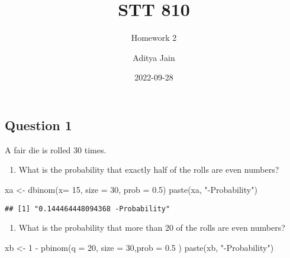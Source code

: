 \documentclass[
]{article}
\title{STT 810}
\subtitle{Homework 2}
\author{Aditya Jain}
\date{2022-09-28}
\newenvironment{Shaded}{\begin{snugshade}}{\end{snugshade}}
\newcommand{\AttributeTok}[1]{\textcolor[rgb]{0.77,0.63,0.00}{#1}}
\newcommand{\DecValTok}[1]{\textcolor[rgb]{0.00,0.00,0.81}{#1}}
\newcommand{\FloatTok}[1]{\textcolor[rgb]{0.00,0.00,0.81}{#1}}
\newcommand{\FunctionTok}[1]{\textcolor[rgb]{0.00,0.00,0.00}{#1}}
\newcommand{\NormalTok}[1]{#1}
\newcommand{\OtherTok}[1]{\textcolor[rgb]{0.56,0.35,0.01}{#1}}
\newcommand{\SpecialCharTok}[1]{\textcolor[rgb]{0.00,0.00,0.00}{#1}}
\newcommand{\StringTok}[1]{\textcolor[rgb]{0.31,0.60,0.02}{#1}}
\providecommand{\tightlist}{%
  \setlength{\itemsep}{0pt}\setlength{\parskip}{0pt}}
\begin{document}
\maketitle

{
\setcounter{tocdepth}{2}
\tableofcontents
}
\newpage

\hypertarget{question-1}{%
\subsection{Question 1}\label{question-1}}

A fair die is rolled 30 times.

\begin{enumerate}
\def\labelenumi{\alph{enumi}.}
\tightlist
\item
  What is the probability that exactly half of the rolls are even
  numbers?
\end{enumerate}

\begin{Shaded}
\begin{Highlighting}[]
\NormalTok{xa }\OtherTok{\textless{}{-}} \FunctionTok{dbinom}\NormalTok{(}\AttributeTok{x=} \DecValTok{15}\NormalTok{, }\AttributeTok{size =} \DecValTok{30}\NormalTok{, }\AttributeTok{prob =} \FloatTok{0.5}\NormalTok{)}
\FunctionTok{paste}\NormalTok{(xa, }\StringTok{"{-}Probability"}\NormalTok{)}
\end{Highlighting}
\end{Shaded}

\begin{verbatim}
## [1] "0.144464448094368 -Probability"
\end{verbatim}

\begin{enumerate}
\def\labelenumi{\alph{enumi}.}
\setcounter{enumi}{1}
\tightlist
\item
  What is the probability that more than 20 of the rolls are even
  numbers?
\end{enumerate}

\begin{Shaded}
\begin{Highlighting}[]
\NormalTok{xb }\OtherTok{\textless{}{-}} \DecValTok{1} \SpecialCharTok{{-}} \FunctionTok{pbinom}\NormalTok{(}\AttributeTok{q =} \DecValTok{20}\NormalTok{, }\AttributeTok{size =} \DecValTok{30}\NormalTok{,}\AttributeTok{prob =} \FloatTok{0.5}\NormalTok{ )}
\FunctionTok{paste}\NormalTok{(xb, }\StringTok{"{-}Probability"}\NormalTok{)}
\end{Highlighting}
\end{Shaded}
\end{document}
